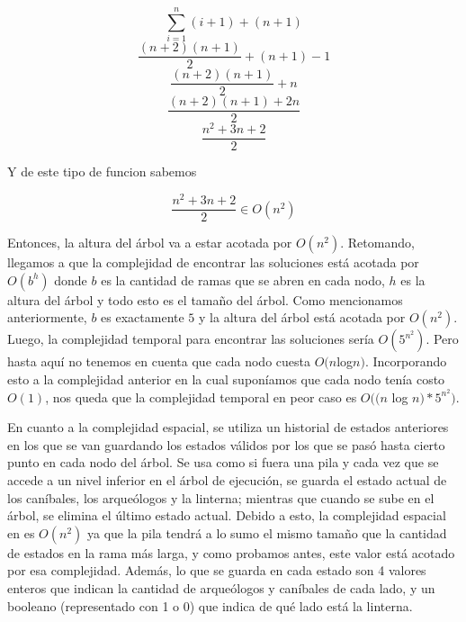       \[
      \sum_{i=1}^{n}(i+1) + (n+1)
      \]
      \[
      \frac{(n+2)(n+1)}{2} + (n+1) - 1
      \]
      \[
      \frac{(n+2)(n+1)}{2} + n
      \]
      \[
      \frac{(n+2)(n+1)+2n}{2}
      \]
      \[
      \frac{n^2+3n+2}{2}
      \]

      Y de este tipo de funcion sabemos \newline

      \[
      \frac{n^2+3n+2}{2} \in O(n^2)
      \]

      Entonces, la altura del árbol va a estar acotada por $O(n^2)$.
      Retomando, llegamos a que la complejidad de encontrar las soluciones está acotada por $O(b^h)$ donde $b$ es la cantidad de ramas que se abren en cada nodo, $h$ es la altura del árbol y todo esto es el tamaño del árbol. Como mencionamos anteriormente, $b$ es exactamente $5$ y la altura del árbol está acotada por $O(n^2)$. Luego, la complejidad temporal para encontrar las soluciones sería $O(5^{n^2})$. Pero hasta aquí no tenemos en cuenta que cada nodo cuesta $O(n $log$ n)$. Incorporando esto a la complejidad anterior en la cual suponíamos que cada nodo tenía costo $O(1)$, nos queda que la complejidad temporal en peor caso es $O((n$ log $n) * 5^{n^2})$.

      En cuanto a la complejidad espacial, se utiliza un historial de estados anteriores en los que se van guardando los estados válidos por los que se pasó hasta cierto punto en cada nodo del árbol. Se usa como si fuera una pila y cada vez que se accede a un nivel inferior en el árbol de ejecución, se guarda el estado actual de los caníbales, los arqueólogos y la linterna; mientras que cuando se sube en el árbol, se elimina el último estado actual. Debido a esto, la complejidad espacial en es $O(n^2)$ ya que la pila tendrá a lo sumo el mismo tamaño que la cantidad de estados en la rama más larga, y como probamos antes, este valor está acotado por esa complejidad. Además, lo que se guarda en cada estado son 4 valores enteros que indican la cantidad de arqueólogos y caníbales de cada lado, y un booleano (representado con 1 o 0) que indica de qué lado está la linterna.



